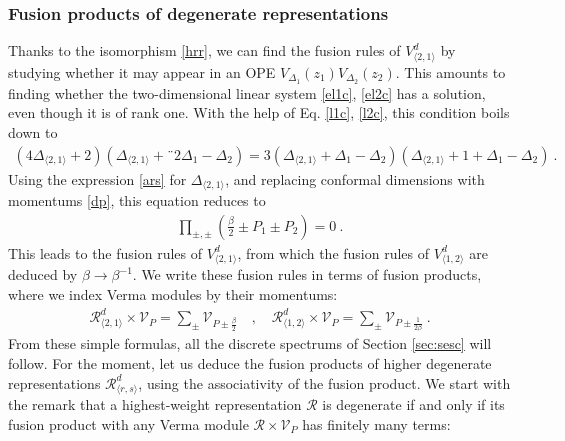 \documentclass[12pt, a4paper]{article}
\theoremstyle{break}
\begin{document}
\subsubsection{Fusion products of degenerate representations}

Thanks to the isomorphism \eqref{hrr}, we can find the fusion rules of $V^d_{\langle 2,1\rangle}$ by studying whether it may appear in an OPE $V_{\Delta_1}(z_1)V_{\Delta_2}(z_2)$. This amounts to finding whether the two-dimensional linear system \eqref{el1c}, \eqref{el2c} has a solution, even though it is of rank one. With the help of Eq. \eqref{l1c}, \eqref{l2c}, this condition boils down to 
\begin{align}
 \left(4\Delta_{\langle 2,1\rangle}+2\right) \left(\Delta_{\langle 2,1\rangle}+¨2\Delta_1-\Delta_2\right) = 3\left(\Delta_{\langle 2,1\rangle}+\Delta_1-\Delta_2\right)\left(\Delta_{\langle 2,1\rangle}+1+\Delta_1-\Delta_2\right)\ .
\end{align}
Using the expression \eqref{ars} for $\Delta_{\langle 2,1\rangle}$, and replacing conformal dimensions with momentums \eqref{dp}, this equation reduces to 
\begin{align}
 \prod_{\pm,\pm}\left(\tfrac{\beta}{2}\pm P_1\pm P_2\right) = 0\ . 
\end{align}
This leads to the fusion rules of $V^d_{\langle 2,1\rangle}$, from which the fusion rules of $V^d_{\langle 1,2\rangle}$ are deduced by $\beta\to \beta^{-1}$. We write these fusion rules in terms of fusion products, where we index Verma modules by their momentums:
\begin{align}
 \boxed{\mathcal{R}^d_{\langle 2,1\rangle}\times \mathcal{V}_P = \sum_\pm \mathcal{V}_{P\pm \frac{\beta}{2}}} \quad, \quad \boxed{\mathcal{R}^d_{\langle 1,2\rangle}\times \mathcal{V}_P = \sum_\pm \mathcal{V}_{P\pm \frac{1}{2\beta}}}\ . 
 \label{rvvp}
\end{align}
From these simple formulas, all the discrete spectrums of Section \ref{sec:sesc} will follow. For the moment, let us deduce the fusion products of higher degenerate representations $\mathcal{R}^d_{\langle r,s\rangle}$, using the associativity of the fusion product. We start with the remark that a highest-weight representation $\mathcal{R}$ is degenerate if and only if its fusion product with any Verma module $\mathcal{R}\times \mathcal{V}_P$ has finitely many terms:
\end{document}
